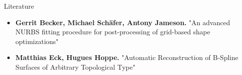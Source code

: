 \begin{frame}{Literature}
\begin{itemize}
\item \textbf{Gerrit Becker, Michael Sch\"afer, Antony Jameson.} "An advanced NURBS fitting procedure for post-processing of grid-based shape optimizations"
\item \textbf{Matthias Eck, Hugues Hoppe.} "Automatic Reconstruction of B-Spline Surfaces of Arbitrary Topological Type"


\end{itemize}
\end{frame}
